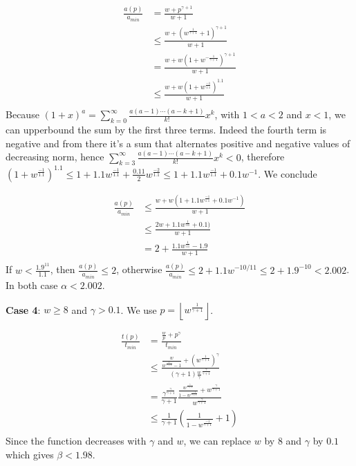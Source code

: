 \documentclass{article}
\begin{document}
\begin{align*}
\frac{a(p)}{a_{min}} &= \frac{w+p^{\gamma+1}}{w+1} \\
&\leq \frac{w+\left(w^{\frac{1}{\gamma+1}}+1\right)^{\gamma+1}}{w+1}\\
&= \frac{w+w\left(1+w^{-\frac{1}{\gamma+1}}\right)^{\gamma+1}}{w+1}\\
&\leq \frac{w+w\left(1+w^{\frac{-1}{1.1}}\right)^{1.1}}{w+1}\\
\end{align*}
Because $(1+x)^a=\sum_{k=0}^\infty \frac{a(a-1)\cdots(a-k+1)}{k!}x^k$, with $1<a<2$ and $x<1$, we can upperbound the sum by the first three terms. Indeed the fourth term is negative and from there it's a sum that alternates positive and negative values of decreasing norm, hence $\sum_{k=3}^\infty \frac{a(a-1)\cdots(a-k+1)}{k!}x^k<0$, therefore $\left(1+w^{\frac{-1}{1.1}}\right)^{1.1} \leq 1+1.1w^{\frac{-1}{1.1}}+\frac{0.11}{2}w^{\frac{-2}{1.1}} \leq 1+1.1w^{\frac{-1}{1.1}}+0.1w^{-1}$. We conclude

\begin{align*}
\frac{a(p)}{a_{min}} &\leq \frac{w+w(1+1.1w^{\frac{-1}{1.1}}+0.1w^{-1})}{w+1} \\
&\leq \frac{2w+1.1w^{\frac{1}{11}}+0.1)}{w+1}\\
&= 2+\frac{1.1w^{\frac{1}{11}}-1.9}{w+1} \\
\end{align*}
If $w<\frac{1.9^{11}}{1.1}$, then $\frac{a(p)}{a_{min}} \leq 2$, otherwise $\frac{a(p)}{a_{min}} \leq 2+1.1w^{-10/11} \leq 2+1.9^{-10} < 2.002$. In both case $\alpha<2.002$.

\textbf{Case 4}:  $w \geq 8$ and $\gamma > 0.1$.
We use $p=\left\lfloor w^{\frac{1}{\gamma+1}} \right\rfloor$.

\begin{align*}
\frac{t(p)}{t_{min}}&=\frac{\frac{w}{p}+p^\gamma}{t_{min}} \\
&\leq \frac{\frac{w}{ w^{\frac{1}{\gamma+1}}-1}+\left( w^{\frac{1}{\gamma+1}}\right)^\gamma}{ \left( \gamma+1\right)\frac{w}{\gamma} ^{\frac{\gamma}{\gamma+1}}} \\
&= \frac{\gamma^{\frac{\gamma}{\gamma+1}}}{\gamma+1} \frac{\frac{w^{\frac{\gamma}{\gamma+1}}}{1-w^\frac{-1}{\gamma+1}}+w^{\frac{\gamma}{\gamma+1}}}{ w^{\frac{\gamma}{\gamma+1}}} \\
&\leq \frac{1}{\gamma+1}\left( \frac{1}{1-w^\frac{-1}{\gamma+1}}+1\right) \\
\end{align*}
Since the function decreases with $\gamma$ and $w$, we can replace $w$ by $8$ and $\gamma$ by $0.1$ which gives $\beta<1.98$.
\end{document}
